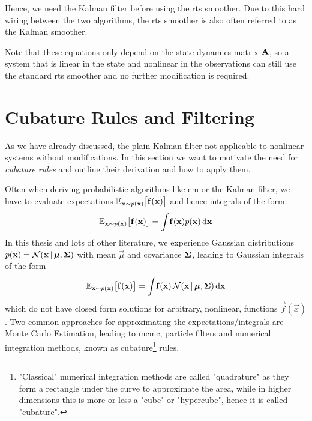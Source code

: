 		Hence, we need the Kalman filter before using the \ac{rts} smoother. Due to this hard wiring between the two algorithms, the \ac{rts} smoother is also often referred to as the Kalman smoother.

		Note that these equations only depend on the state dynamics matrix \( \boldsymbol{\mathrm{A}} \), so a system that is linear in the state and nonlinear in the observations can still use the standard \ac{rts} smoother and no further modification is required.

\section{Cubature Rules and Filtering}
	\label{sec:cubatureRules}

	As we have already discussed, the plain Kalman filter not applicable to nonlinear systems without modifications. In this section we want to motivate the need for \emph{cubature rules} and outline their derivation and how to apply them.

	Often when deriving probabilistic algorithms like \ac{em} or the Kalman filter, we have to evaluate expectations \( \mathbb{E}_{\boldsymbol{\mathrm{x}} \sim p(\boldsymbol{\mathrm{x}})}\big[ \boldsymbol{\mathrm{f}}(\boldsymbol{\mathrm{x}}) \big] \) and hence integrals of the form:
	\begin{equation*}
		\mathbb{E}_{\boldsymbol{\mathrm{x}} \sim p(\boldsymbol{\mathrm{x}})}\big[ \boldsymbol{\mathrm{f}}(\boldsymbol{\mathrm{x}}) \big] = \int\! \boldsymbol{\mathrm{f}}(\boldsymbol{\mathrm{x}}) p(\boldsymbol{\mathrm{x}}) \dd{\boldsymbol{\mathrm{x}}}
	\end{equation*}
	In this thesis and lots of other literature, we experience Gaussian distributions \( p(\boldsymbol{\mathrm{x}}) = \mathcal{N}(\boldsymbol{\mathrm{x}} \,\vert\, \boldsymbol{\mathrm{\mu}}, \boldsymbol{\mathrm{\Sigma}}) \) with mean \(\vec{\mu}\) and covariance \(\boldsymbol{\mathrm{\Sigma}}\), leading to Gaussian integrals of the form
	\begin{equation*}
		\mathbb{E}_{\boldsymbol{\mathrm{x}} \sim p(\boldsymbol{\mathrm{x}})}\big[ \boldsymbol{\mathrm{f}}(\boldsymbol{\mathrm{x}}) \big] = \int\! \boldsymbol{\mathrm{f}}(\boldsymbol{\mathrm{x}}) \, \mathcal{N}(\boldsymbol{\mathrm{x}} \,\vert\, \boldsymbol{\mathrm{\mu}}, \boldsymbol{\mathrm{\Sigma}}) \dd{\boldsymbol{\mathrm{x}}}
	\end{equation*}
	which do not have closed form solutions for arbitrary, nonlinear, functions \( \vec{f}(\vec{x}) \). Two common approaches for approximating the expectations/integrals are Monte Carlo Estimation, leading to \ac{mcmc}, particle filters and numerical integration methods, known as cubature\footnote{"Classical" numerical integration methods are called "quadrature" as they form a rectangle under the curve to approximate the area, while in higher dimensions this is more or less a "cube" or "hypercube", hence it is called "cubature".} rules.

